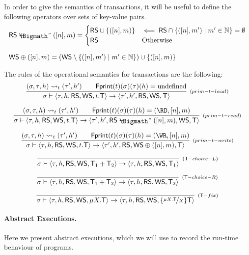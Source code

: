 \documentclass[a4paper,UKenglish]{article}%
\theoremstyle{plain}
\begin{document}
In order to give the semantics of transactions, it will be useful to define the following operators over sets of key-value pairs. 
\[
\begin{array}{lll}
\RS \RScup ([n], m) = \begin{cases}
\RS \cup \{([n], m)\} &\impliedby \RS \cap \{([n], m') \mid m' \in \mathbb{N}\} = \emptyset\\
\RS &\text{Otherwise}
\end{cases}\\[20pt]
\WS \WScup ([n], m) = (\WS \setminus \{([n], m') \mid m' \in \mathbb{N}\}) \cup \{([n], m)\}
\end{array}
\]

The rules of the operational semantics for transactions are the following: 
\[
\infer[{\scriptstyle{(prim-t-local)}}]
{\thdstack \vdash \langle \txstack, \heap, \RS, \WS, t.\Tx  \rangle \rightarrow \langle \txstack', \heap', \RS, \WS, \Tx \rangle}
{(\thdstack, \txstack, \heap) \rightsquigarrow_t (\txstack', \heap') \qquad \fingerprint(t)(\thdstack)(\txstack)(\heap) = \text{undefined}}
\]

\[
\infer[{\scriptstyle{(prim-t-read)}}]
{\thdstack \vdash \langle \txstack, \heap, \RS, \WS, t.\Tx  \rangle \rightarrow \langle \txstack', \heap', \RS \RScup ([n],m), \WS, \Tx \rangle}
{(\thdstack, \txstack, \heap) \rightsquigarrow_t (\txstack', \heap') \qquad \fingerprint(t)(\thdstack)(\txstack)(\heap) = (\RD, [n], m)}
\]

\[
\infer[{\scriptstyle{(prim-t-write)}}]
{\thdstack \vdash \langle \txstack, \heap, \RS, \WS, t.\Tx \rangle \rightarrow \langle \txstack', \heap', \RS, \WS \WScup ([n],m), \Tx \rangle}
{(\thdstack, \txstack, \heap) \rightsquigarrow_t (\txstack', \heap') \qquad \fingerprint(t)(\thdstack)(\txstack)(\heap) = (\WR, [n], m)}
\]

\[
\infer[{\scriptstyle{(\Tx-choice-L)}}]{\thdstack \vdash \langle \txstack, \heap, \RS, \WS, \Tx_1 + \Tx_2 \rangle 
\rightarrow \langle  \txstack, \heap, \RS, \WS, \Tx_1 \rangle}{}
\]

\[
\infer[{\scriptstyle{(\Tx-choice-R)}}]{\thdstack \vdash \langle \txstack, \heap, \RS, \WS, \Tx_1 + \Tx_2 \rangle 
\rightarrow \langle  \txstack, \heap, \RS, \WS, \Tx_2 \rangle}{}
\]

\[
\infer[{\scriptstyle{(\Tx-fix)}}]{\thdstack \vdash \langle \txstack, \heap, \RS, \WS, \mu X.\Tx \rangle 
\rightarrow \langle  \txstack, \heap, \RS, \WS, \{\nicefrac{\mu X.\Tx}{X}\}\Tx \rangle}{}
\]

\paragraph{\textbf{Abstract Executions.}}
Here we present abstract executions, which we will use to record the 
run-time behaviour of programs. 
\end{document}
